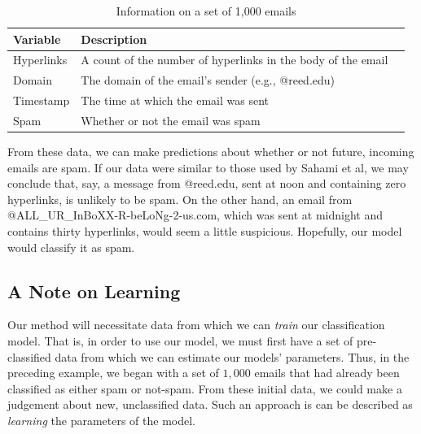 \documentclass[12pt,twoside]{reedthesis}
\begin{document}
	\begin{table}[htdp] %
\caption[Example Data for Classifications]{Information on a set of 1,000 emails} 
\begin{center}
\begin{tabular}{l | l l} 
 \toprule
  \textbf{Variable} & \textbf{Description} \\ %
  \midrule %
  Hyperlinks  & A count of the number of hyperlinks in the body of the email \\ %
  Domain & The domain of the email's sender (e.g., @reed.edu) \\
  Timestamp & The time at which the email was sent \\
  Spam & Whether or not the email was spam \\
\bottomrule %
\end{tabular}
\end{center}
\label{bvf} %
\end{table}

From these data, we can make predictions about whether or not future, incoming emails are spam. If our data were similar to those used by Sahami et al, we may conclude that, say, a message from @reed.edu, sent at noon and containing zero hyperlinks, is unlikely to be spam. On the other hand, an email from @ALL\_UR\_InBoXX-R-beLoNg-2-us.com, which was sent at midnight and contains thirty hyperlinks, would seem a little suspicious. Hopefully, our model would classify it as spam.
	
	\subsection*{A Note on Learning}
	Our method will necessitate data from which we can {\em train} our classification model. That is, in order to use our model, we must first have a set of pre-classified data from which we can estimate our models' parameters. Thus, in the preceding example, we began with a set of $1,000$ emails that had already been classified as either spam or not-spam. From these initial data, we could make a judgement about new, unclassified data. Such an approach is can be described as {\em learning} the parameters of the model.
	
\end{document}
